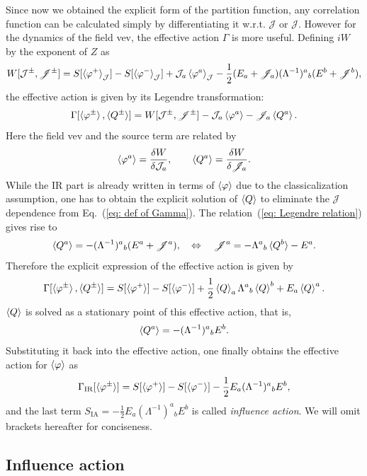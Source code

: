 \documentclass[aps, prd
, preprint
, nofootinbib 
]{revtex4-1}
\newcommand{\bae}[1]{\begin{align} #1 \end{align}}
\begin{document}
Since now we obtained the explicit form of the partition function, any correlation function can be calculated simply by 
differentiating it w.r.t. $\mathcal{J}$ or $\mathscr{J}$. However for the dynamics of the field vev, the effective action $\Gamma$ is more useful.
Defining $iW$ by the exponent of $Z$ as
\bae{
	W[\mathcal{J}^\pm,\mathscr{J}^\pm]=S[\braket{\varphi^+}_\mathcal{J}]-S[\braket{\varphi^-}_\mathcal{J}]
	+\mathcal{J}_a\braket{\varphi^a}_\mathcal{J}-\frac{1}{2}(E_a+\mathscr{J}_a)(\Lambda^{-1})^a{}_b(E^b+\mathscr{J}^b),
}
the effective action is given by its Legendre transformation:
\bae{\label{eq: def of Gamma}
	\Gamma[\braket{\varphi^\pm},\braket{Q^\pm}]=W[\mathcal{J}^\pm,\mathscr{J}^\pm]-\mathcal{J}_a\braket{\varphi^a}-\mathscr{J}_a\braket{Q^a}.
}
Here the field vev and the source term are related by
\bae{\label{eq: Legendre relation}
	\braket{\varphi^a}=\frac{\delta W}{\delta\mathcal{J}_a}, \quad\quad \braket{Q^a}=\frac{\delta W}{\delta\mathscr{J}_a}.
}
While the IR part is already written in terms of $\braket{\varphi}$ due to the classicalization assumption,
one has to obtain the explicit solution of $\braket{Q}$ to eliminate the $\mathscr{J}$ dependence from Eq.~(\ref{eq: def of Gamma}).
The relation~(\ref{eq: Legendre relation}) gives rise to
\bae{
	\braket{Q^a}=-(\Lambda^{-1})^a{}_b(E^a+\mathscr{J}^a), \quad \Leftrightarrow \quad \mathscr{J}^a=-\Lambda^a{}_b\braket{Q^b}-E^a.
}
Therefore the explicit expression of the effective action is given by
\bae{
	\Gamma[\braket{\varphi^\pm},\braket{Q^\pm}]=S[\braket{\varphi^+}]-S[\braket{\varphi^-}]
	+\frac{1}{2}\braket{Q}_a\Lambda^a{}_b\braket{Q}^b+E_a\braket{Q}^a.
}
$\braket{Q}$ is solved as a stationary point of this effective action, that is,
\bae{
	\braket{Q^a}=-(\Lambda^{-1})^a{}_bE^b.
}
Substituting it back into the effective action, one finally obtains the effective action for $\braket{\varphi}$ as
\bae{
	\Gamma_\text{IR}[\braket{\varphi^\pm}]=S[\braket{\varphi^+}]-S[\braket{\varphi^-}]-\frac{1}{2}E_a(\Lambda^{-1})^a{}_bE^b,
}
and the last term $S_\text{IA}=-\frac{1}{2}E_a(\Lambda^{-1})^a{}_bE^b$ is called \emph{influence action}.
We will omit brackets hereafter for conciseness.





\subsection{Influence action}
\end{document}
